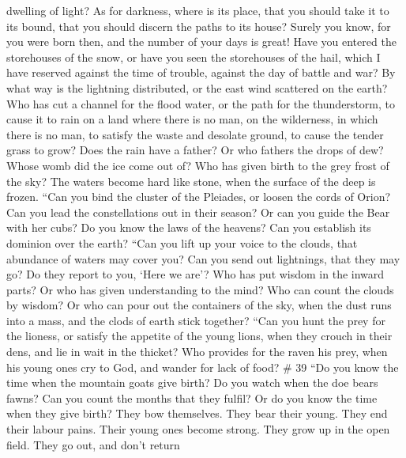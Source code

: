 dwelling of light? As for darkness, where is its place, 
that you should take it to its bound, that you should discern the paths
to its house?  Surely you know, for you were born then,
and the number of your days is great!  Have you entered
the storehouses of the snow, or have you seen the storehouses of the
hail,  which I have reserved against the time of trouble,
against the day of battle and war?  By what way is the
lightning distributed, or the east wind scattered on the earth?
 Who has cut a channel for the flood water, or the path
for the thunderstorm,  to cause it to rain on a land
where there is no man, on the wilderness, in which there is no man,
 to satisfy the waste and desolate ground, to cause the
tender grass to grow?  Does the rain have a father? Or
who fathers the drops of dew?  Whose womb did the ice
come out of? Who has given birth to the grey frost of the sky?
 The waters become hard like stone, when the surface of
the deep is frozen.  ``Can you bind the cluster of the
Pleiades, or loosen the cords of Orion?  Can you lead the
constellations out in their season? Or can you guide the Bear with her
cubs?  Do you know the laws of the heavens? Can you
establish its dominion over the earth?  ``Can you lift up
your voice to the clouds, that abundance of waters may cover you?
 Can you send out lightnings, that they may go? Do they
report to you, `Here we are'?  Who has put wisdom in the
inward parts? Or who has given understanding to the mind?
 Who can count the clouds by wisdom? Or who can pour out
the containers of the sky,  when the dust runs into a
mass, and the clods of earth stick together?  ``Can you
hunt the prey for the lioness, or satisfy the appetite of the young
lions,  when they crouch in their dens, and lie in wait
in the thicket?  Who provides for the raven his prey,
when his young ones cry to God, and wander for lack of food? \# 39
 ``Do you know the time when the mountain goats give
birth? Do you watch when the doe bears fawns?  Can you
count the months that they fulfil? Or do you know the time when they
give birth?  They bow themselves. They bear their young.
They end their labour pains.  Their young ones become
strong. They grow up in the open field. They go out, and don't return
